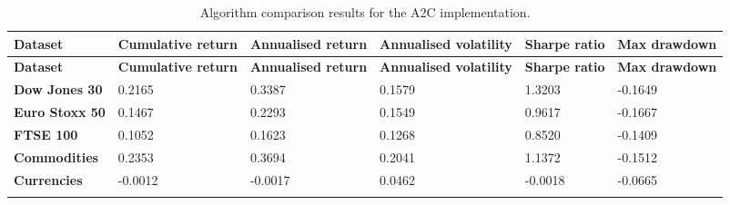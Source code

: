 \begin{longtable}{|l|p{2.1cm}|p{2.1cm}|p{2.1cm}|p{1.5cm}|p{2cm}|}
    \hline
    \textbf{Dataset} & \textbf{Cumulative return} & \textbf{Annualised return} & \textbf{Annualised volatility} & \textbf{Sharpe ratio} & \textbf{Max drawdown}  \\ \midrule
    \endfirsthead

    \hline
    \textbf{Dataset} & \textbf{Cumulative return} & \textbf{Annualised return} & \textbf{Annualised volatility} & \textbf{Sharpe ratio} & \textbf{Max drawdown}  \\ \midrule
    \endhead

    \endfoot
    \hline

    \textbf{Dow Jones 30} & 0.2165 & 0.3387 & 0.1579 & 1.3203 & -0.1649 \\ \hline
    \textbf{Euro Stoxx 50} & 0.1467 & 0.2293 & 0.1549 & 0.9617 & -0.1667 \\ \hline
    \textbf{FTSE 100} & 0.1052 & 0.1623 & 0.1268 & 0.8520 & -0.1409 \\ \hline
    \textbf{Commodities} & 0.2353 & 0.3694 & 0.2041 & 1.1372 & -0.1512 \\ \hline
    \textbf{Currencies} & -0.0012 & -0.0017 & 0.0462 & -0.0018 & -0.0665 \\ \hline 

    \caption{Algorithm comparison results for the A2C implementation.}
    \label{tab:experiment_algorithms_a2c}
\end{longtable}